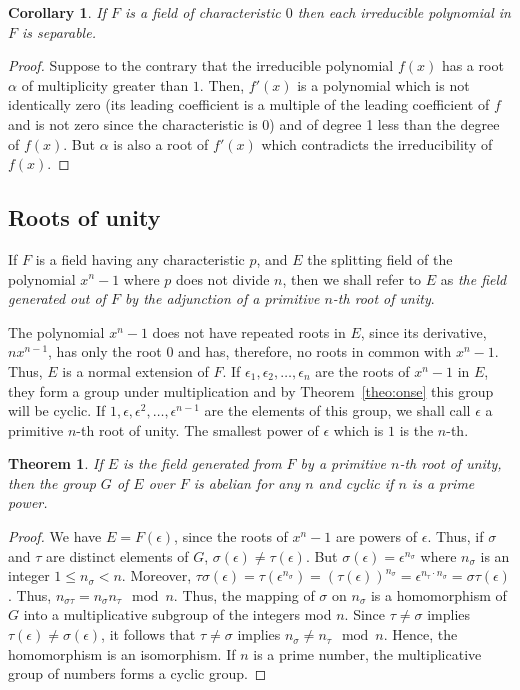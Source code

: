\documentclass[10pt,leqno]{article}
\newtheorem{theo}{Theorem}
\newtheorem*{coro*}{Corollary}
\theoremstyle{definition}
\begin{document}
\begin{coro*}
If $F$ is a field of characteristic $0$ then each irreducible polynomial in $F$ is separable.
\end{coro*}

\begin{proof}
Suppose to the contrary that the irreducible polynomial $f(x)$ has a root $\alpha$ of multiplicity greater than $1$.
Then, $f'(x)$ is a polynomial which is not identically zero (its leading coefficient is a multiple of the leading coefficient of $f$ and is not zero since the characteristic is $0$) and of degree 1 less than the degree of $f(x)$.
But $\alpha$ is also a root of $f'(x)$ which contradicts the irreducibility of $f(x)$.
\end{proof}


\subsection{Roots of unity}

If $F$ is a field having any characteristic $p$, and $E$ the splitting field of the polynomial $x^n - 1$ where $p$ does not divide $n$, then we shall refer to $E$ as \emph{the field generated out of $F$ by the adjunction of a primitive $n$-th root of unity}.

The polynomial $x^n - 1$ does not have repeated roots in $E$, since its derivative, $n x^{n-1}$, has only the root $0$ and has, therefore, no roots in common with $x^n - 1$.
Thus, $E$ is a normal extension of $F$.
If $\epsilon_1, \epsilon_2, \ldots, \epsilon_n$ are the roots of $x^n - 1$ in $E$, they form a group under multiplication and by Theorem~\ref{theo:onse} this group will be cyclic.
If $1, \epsilon, \epsilon^2, \ldots, \epsilon^{n-1}$ are the elements of this group, we shall call $\epsilon$ a primitive $n$-th root of unity.
The smallest power of $\epsilon$ which is $1$ is the $n$-th.


\begin{theo}
\label{theo:twze}
If $E$ is the field generated from $F$ by a primitive $n$-th root of unity, then the group $G$ of $E$ over $F$ is abelian for any $n$ and cyclic if $n$ is a prime power.
\end{theo}


\begin{proof}
We have $E = F(\epsilon)$, since the roots of $x^n - 1$ are powers of $\epsilon$.
Thus, if $\sigma$ and $\tau$ are distinct elements of $G$, $\sigma(\epsilon) \not= \tau(\epsilon)$.
But $\sigma(\epsilon) = \epsilon^{n_\sigma}$ where $n_\sigma$ is an integer $1 \leq n_\sigma < n$.
Moreover, $\tau \sigma(\epsilon) = \tau(\epsilon^{n_\sigma}) = (\tau(\epsilon))^{n_\sigma} = \epsilon^{n_\tau \cdot n_\sigma} = \sigma \tau(\epsilon)$.
Thus, $n_{\sigma\tau} = n_\sigma n_\tau \mod n$.
Thus, the mapping of $\sigma$ on $n_\sigma$ is a homomorphism of $G$ into a multiplicative subgroup of the integers mod $n$.
Since $\tau \not= \sigma$ implies $\tau(\epsilon) \not= \sigma(\epsilon)$, it follows that $\tau \not= \sigma$ implies $n_{\sigma} \not= n_\tau \mod n$.
Hence, the homomorphism is an isomorphism.
If $n$ is a prime number, the multiplicative group of numbers forms a cyclic group.
\end{proof}
\end{document}
